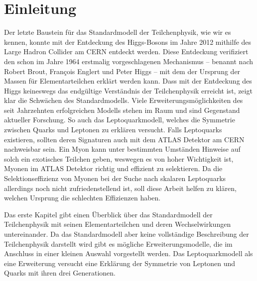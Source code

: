 



\tableofcontents

\chapter{Einleitung}%
Der letzte Baustein für das Standardmodell der Teilchenphysik, wie wir es kennen, konnte mit der Entdeckung des Higgs-Bosons im Jahre 2012 mithilfe des Large Hadron Collider am CERN entdeckt werden. Diese Entdeckung verifiziert den schon im Jahre 1964 erstmalig vorgeschlagenen Mechanismus -- benannt nach Robert Brout, François Englert und Peter Higgs -- mit dem der Ursprung der Massen für Ele\-mentar\-teilchen erklärt werden kann. Dass mit der Entdeckung des Higgs keineswegs das endgültige Verständnis der Teilchenphysik erreicht ist, zeigt klar die Schwächen des Standardmodells. Viele Erweiterungsmöglichkeiten des seit Jahrzehnten er\-folg\-rei\-chen Modells stehen im Raum und sind Gegenstand aktueller Forschung. So auch das Leptoquarkmodell, welches die Symmetrie zwischen Quarks und Leptonen zu erklären versucht. Falls Leptoquarks existieren, sollten deren Signaturen auch mit dem ATLAS Detektor am CERN nachweisbar sein. Ein Myon kann unter bestimmten Umständen Hinweise auf solch ein exotisches Teilchen geben, weswegen es von hoher Wichtigkeit ist, Myonen im ATLAS Detektor richtig und effizient zu selektieren. Da die Selektionseffizienz von Myonen bei der Suche nach skalaren Leptoquarks allerdings noch nicht zufriedenstellend ist, soll diese Arbeit helfen zu klären, welchen Ursprung die schlechten Effizienzen haben.

Das erste Kapitel gibt einen Überblick über das Standardmodell der Teilchenphysik mit seinen Elementarteilchen und deren Wechselwirkungen untereinander. Da das Standardmodell aber keine vollständige Beschreibung der Teilchenphysik darstellt wird gibt es mögliche Erweiterungsmodelle, die im Anschluss in einer kleinen Auswahl vorgestellt werden. Das Leptoquarkmodell als eine Erweiterung versucht eine Erklärung der Symmetrie von Leptonen und Quarks mit ihren drei Generationen. 

